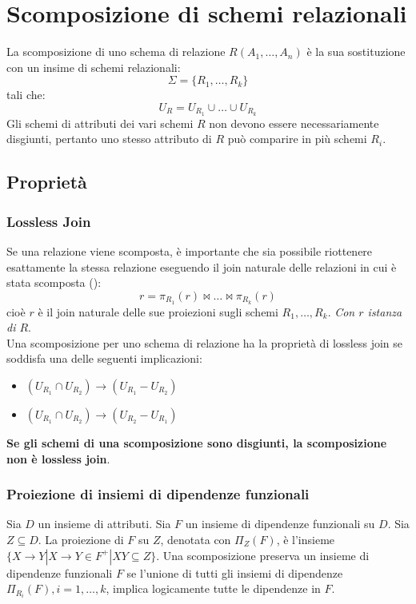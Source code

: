 \documentclass[12pt, a4paper]{report}
\begin{document}
    \section{Scomposizione di schemi relazionali}
    La scomposizione di uno schema di relazione $R(A_{1},\ldots, A_{n})$ è la sua sostituzione con un insime di schemi relazionali:
    \begin{equation*}
        \Sigma = \{R_{1},\ldots,R_{k}\}
    \end{equation*}
    tali che:
    \begin{equation*}
        U_{R} = U_{R_{1}} \cup \ldots \cup U_{R_{k}}
    \end{equation*}
    Gli schemi di attributi dei vari schemi $R$ non devono essere necessariamente disgiunti, pertanto uno stesso attributo di $R$ può comparire in più schemi $R_{i}$.
    \subsection{Proprietà}
    \subsubsection{Lossless Join}
    Se una relazione viene scomposta, è importante che sia possibile riottenere esattamente la stessa relazione eseguendo il join naturale delle relazioni in cui è stata scomposta ():
    \begin{equation*}
        r = \pi_{R_{1}}(r)\bowtie \ldots \bowtie \pi_{R_{k}}(r)
    \end{equation*}
    cioè $r$ è il join naturale delle sue proiezioni sugli schemi $R_{1},\ldots,R_{k}$. \textit{Con $r$ istanza di $R$}.\\
    Una scomposizione per uno schema di relazione ha la proprietà di lossless join se soddisfa una delle seguenti implicazioni:
    \begin{itemize}
        \item $(U_{R_{1}} \cap U_{R_{2}}) \rightarrow (U_{R_{1}}-U_{R_{2}})$
        \item $(U_{R_{1}} \cap U_{R_{2}}) \rightarrow (U_{R_{2}}-U_{R_{1}})$
    \end{itemize}
    \textbf{Se gli schemi di una scomposizione sono disgiunti, la scomposizione non è  lossless join}.
    \subsubsection{Proiezione di insiemi di dipendenze funzionali}
    Sia $D$ un insieme di attributi. Sia $F$ un insieme di dipendenze funzionali su $D$. Sia $Z\subseteq D$. La proiezione di $F$ su $Z$, denotata con $\Pi_{Z}(F)$, è l'insieme $\{X\rightarrow Y|X\rightarrow Y \in F^{+}|XY\subseteq Z\}$.
    Una scomposizione preserva un insieme di dipendenze funzionali $F$ se l'unione di tutti gli insiemi di dipendenze $\Pi_{R_{i}}(F),i=1,\ldots,k$, implica logicamente tutte le dipendenze in $F$.
\end{document}
